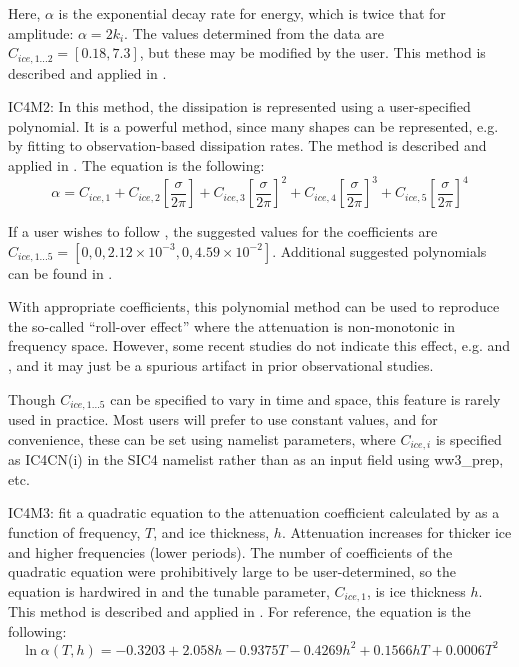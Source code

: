 \noindent Here, $\alpha$ is the exponential decay rate for energy, which is twice that for amplitude: $\alpha = 2k_i$. The values determined from the data are ${C_{ice,1...2}}=[0.18, 7.3]$, but these may be modified by the user. This method is described and applied in \cite{rep:CR17}.

{\code IC4M2}: In this method, the dissipation is represented using a user-specified polynomial. It is a powerful method, since many shapes can be represented, e.g. by fitting to observation-based dissipation rates. The method is described and applied in \cite{rep:CR17}. The equation is the following:
\begin{equation}\label{eq:ice2}
  {\alpha} = C_{ice,1} + C_{ice,2}\left[{\frac{\sigma}{2\pi}}\right] + C_{ice,3}\left[{\frac{\sigma}{2\pi}}\right]^2 + C_{ice,4}\left[{\frac{\sigma}{2\pi}}\right]^3 + C_{ice,5}\left[{\frac{\sigma}{2\pi}}\right]^4
\end{equation}

\noindent
If a user wishes to follow \cite{art:MBK14}, the suggested values for the coefficients are ${C_{ice,1...5}}=[0, 0, 2.12\times 10^{-3}, 0, 4.59\times 10^{-2}]$. Additional suggested polynomials can be found in \cite{rep:RMK18}.

With appropriate coefficients, this polynomial method can be used to reproduce the so-called “roll-over effect” where the attenuation is non-monotonic in frequency space. However, some recent studies do not indicate this effect, e.g. \cite{art:RTS16} and \cite{art:LK17}, and it may just be a spurious artifact in prior observational studies.

Though ${C_{ice,1...5}}$ can be specified to vary in time and space, this feature is rarely used in practice. Most users will prefer to use constant values, and for convenience, these can be set using namelist parameters, where $C_{ice,i}$ is specified as {\code IC4CN(i)} in the {\code SIC4} namelist rather than as an input field using {\file ww3\_prep}, etc.

{\code IC4M3}: \cite{art:HT15} fit a quadratic equation to the attenuation coefficient calculated by \cite{art:KM08} as a function of frequency, $T$, and ice thickness, $h$. Attenuation increases for thicker ice and higher frequencies (lower periods). The number of  coefficients of the quadratic equation were prohibitively large to be user-determined, so the equation is hardwired in and the tunable parameter, ${C_{ice,1}}$, is ice thickness $h$. This method is described and applied in \cite{rep:CR17}. For reference, the equation is the following:
\begin{equation}\label{eq:ice3}
  {\ln{\alpha(T,h)}} = -0.3203 + 2.058h - 0.9375T - 0.4269h^2 + 0.1566hT + 0.0006T^2
\end{equation}

